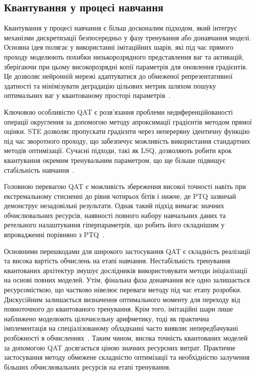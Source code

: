 \documentclass{pma-mthesis}
\begin{document}
\subsection{Квантування у процесі навчання}

Квантування у процесі навчання є більш досконалим підходом, який інтегрує механізми дискретизації безпосередньо у фазу тренування або донавчання моделі. Основна ідея полягає у використанні імітаційних шарів, які під час прямого проходу моделюють похибки низькорозрядного представлення ваг та активацій, зберігаючи при цьому високорозрядні копії параметрів для оновлення градієнтів. Це дозволяє нейронній мережі адаптуватися до обмеженої репрезентативної здатності та мінімізувати деградацію цільових метрик шляхом пошуку оптимальних ваг у квантованому просторі параметрів~\cite{jacob2018quantization}.

Ключовою особливістю QAT є розв'язання проблеми недиференційованості операції округлення за допомогою методу апроксимації градієнтів методом прямої оцінки. STE дозволяє пропускати градієнти через неперервну ідентичну функцію під час зворотного проходу, що забезпечує можливість використання стандартних методів оптимізації. Сучасні підходи, такі як LSQ, дозволяють робити крок квантування окремим тренувальним параметром, що ще більше підвищує стабільність навчання~\cite{Esser2020LSQ}.

Головною перевагою QAT є можливість збереження високої точності навіть при екстремальному стисненні до рівня чотирьох бітів і нижче, де PTQ зазвичай демонструє незадовільні результати. Однак такий підхід вимагає значних обчислювальних ресурсів, наявності повного набору навчальних даних та ретельного налаштування гіперпараметрів, що робить його складнішим у впровадженні порівняно з PTQ~\cite{nagel2021white}.

Основними перешкодами для широкого застосування QAT є складність реалізації та висока вартість обчислень на етапі навчання. Нестабільність тренування квантованих архітектур змушує дослідників використовувати методи ініціалізації на основі повних моделей. Утім, фінальна фаза донавчання все одно залишається ресурсомісткою, що частково нівелює переваги методу під час етапу розробки. Дискусійним залишається визначення оптимального моменту для переходу від повноточного до квантованого тренування. Крім того, імітаційні шари лише наближено моделюють цілочисельну арифметику, тоді як практична імплементація на спеціалізованому обладнанні часто виявляє непередбачувані розбіжності в обчисленнях~\cite{dremov2026compute}. Таким чином, висока точність квантованих моделей за допомогою QAT досягається ціною значних ресурсних витрат. Практичне застосування методу обмежене складністю оптимізації та необхідністю залучення більших обчислювальних ресурсів на етапі тренування.
\end{document}
